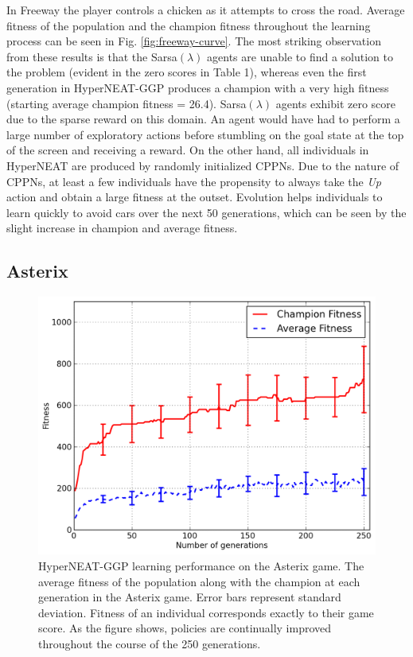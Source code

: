 \documentclass{sig-alternate}
\begin{document}
In Freeway the player controls a chicken as it attempts to cross the road. Average fitness of the population and the champion fitness throughout the learning process can be seen in Fig. \ref{fig:freeway-curve}. The most striking observation from these results is that the Sarsa$(\lambda)$ agents are unable to find a solution to the problem (evident in the zero scores in Table 1), whereas even the first generation in HyperNEAT-GGP produces a champion with a very high fitness (starting average champion fitness = 26.4). Sarsa$(\lambda)$ agents exhibit zero score due to the sparse reward on this domain. An agent would have had to perform a large number of exploratory actions before stumbling on the goal state at the top of the screen and receiving a reward. On the other hand, all individuals in HyperNEAT are produced by randomly initialized CPPNs. Due to the nature of CPPNs, at least a few individuals have the propensity to always take the \textit{Up} action and obtain a large fitness at the outset. Evolution helps individuals to learn quickly to avoid cars over the next 50 generations, which can be seen by the slight increase in champion and average fitness.

\subsection {Asterix}

\begin{figure}[ht]
\begin{center}
\includegraphics[width=\columnwidth]{figures/asterix-results}
\end{center}
\caption{HyperNEAT-GGP learning performance on the Asterix game. The average fitness of the population along with the champion at each generation in the Asterix game. Error bars represent standard deviation. Fitness of an individual corresponds exactly to their game score. As the figure shows, policies are continually improved throughout the course of the 250 generations.}
\label{fig:asterix-curve}
\end{figure}
\end{document}
